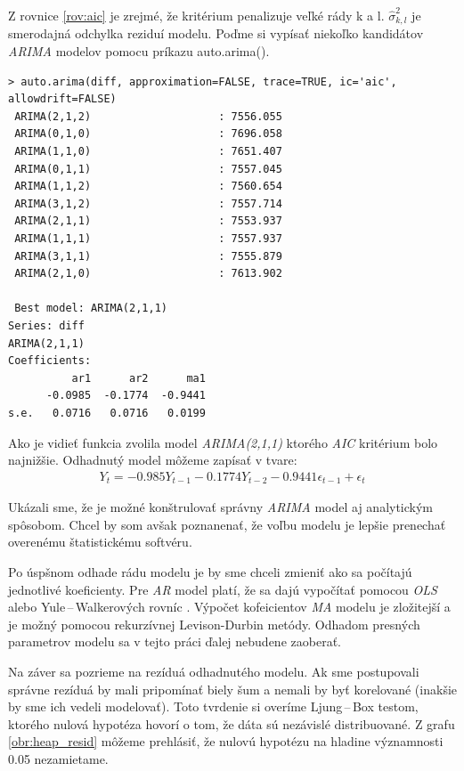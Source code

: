 \documentclass[12pt,a4paper,oneside,final]{article}
\theoremstyle{definition}
\theoremstyle{remark}
\numberwithin{equation}{section}
\begin{document}
Z rovnice \ref{rov:aic} je zrejmé, že kritérium penalizuje veľké rády k a l. 
$\hat{\sigma}^{2}_{k,l}$ je smerodajná odchylka reziduí modelu. 
Poďme si vypísať niekoľko kandidátov \emph{ARIMA} modelov pomocu príkazu auto.arima().

\begin{minipage}{\linewidth}
\begingroup
\fontsize{9pt}{7pt}\selectfont %
\begin{verbatim}
> auto.arima(diff, approximation=FALSE, trace=TRUE, ic='aic', allowdrift=FALSE)
 ARIMA(2,1,2)                    : 7556.055
 ARIMA(0,1,0)                    : 7696.058
 ARIMA(1,1,0)                    : 7651.407
 ARIMA(0,1,1)                    : 7557.045
 ARIMA(1,1,2)                    : 7560.654
 ARIMA(3,1,2)                    : 7557.714
 ARIMA(2,1,1)                    : 7553.937
 ARIMA(1,1,1)                    : 7557.937
 ARIMA(3,1,1)                    : 7555.879
 ARIMA(2,1,0)                    : 7613.902

 Best model: ARIMA(2,1,1)                    
Series: diff 
ARIMA(2,1,1)                    
Coefficients:
          ar1      ar2      ma1
      -0.0985  -0.1774  -0.9441
s.e.   0.0716   0.0716   0.0199
\end{verbatim}
\endgroup
\end{minipage}

Ako je vidieť funkcia zvolila model \emph{ARIMA(2,1,1)} ktorého \emph{AIC} kritérium bolo najnižšie.
Odhadnutý model môžeme zapísať v tvare:
\begin{eqnarray} \label{rov:arima_model}
    Y_t = -0.985 Y_{t-1} - 0.1774 Y_{t-2} -0.9441\epsilon_{t-1} + \epsilon_{t}
\end{eqnarray}

Ukázali sme, že je možné konštrulovať správny \emph{ARIMA} model aj analytickým spôsobom. 
Chcel by som avšak poznanenať, že voľbu modelu je lepšie prenechať overenému 
štatistickému softvéru. 

Po úspšnom odhade rádu modelu je by sme chceli zmieniť ako sa počítajú jednotlivé
koeficienty. Pre \emph{AR} model platí, že sa dajú vypočítať pomocou \emph{OLS} alebo Yule\,--\,Walkerových
rovníc \cite{brockwell_ts}. Výpočet kofeicientov \emph{MA} modelu je zložitejší a 
je možný pomocou rekurzívnej Levison-Durbin metódy.
Odhadom presných parametrov modelu sa v tejto práci ďalej nebudene zaoberať.  

Na záver sa pozrieme na rezíduá odhadnutého modelu. Ak sme postupovali správne rezíduá by
mali pripomínať biely šum a nemali by byť korelované (inakšie by sme ich
vedeli modelovať). Toto tvrdenie si overíme Ljung\,--\,Box testom, ktorého nulová hypotéza
hovorí o tom, že dáta sú nezávislé distribuované. Z grafu \ref{obr:heap_resid} môžeme
prehlásiť, že nulovú hypotézu na hladine významnosti 0.05 nezamietame.
\end{document}
